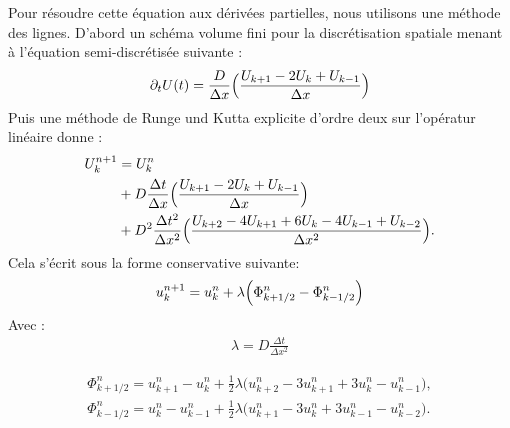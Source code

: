 Pour résoudre cette équation aux dérivées partielles, nous utilisons une méthode des lignes. 
D'abord un schéma volume fini pour la discrétisation spatiale menant à l'équation semi-discrétisée suivante : 
\begin{align}
    \partial_t U(t) = \frac{D}{\Delta x} \Bigl(\frac{U_{k+1} - 2 U_{k} + U_{k-1}}{\Delta x}\Bigr)
\end{align}
Puis une méthode de Runge und Kutta explicite d'ordre deux sur l'opératur linéaire donne :
\begin{align}
    U_k^{n+1} &= U_k^n\\ \notag
    &+ D \frac{\Delta t}{\Delta x} \Bigl(\frac{U_{k+1} - 2 U_{k} + U_{k-1}}{\Delta x}\Bigr)\\ \notag
    &+ D^2 \frac{\Delta t^2}{\Delta x^2} \Bigl(\frac{U_{k+2} -4 U_{k+1}  +6 U_{k} -4 U_{k-1} + U_{k-2}}{\Delta x^2}\Bigr).
\end{align}
Cela s'écrit sous la forme conservative suivante:
\begin{align}
    u^{n+1}_k = u^n_k + \lambda \Bigl( \Phi^n_{k+1/2} - \Phi^n_{k-1/2} \Bigr)
\end{align}
Avec : 
\begin{align}
    \lambda = D \frac{\Delta t}{\Delta x^2}
\end{align}

\begin{align}
    \Phi^n_{k+1/2} = u^n_{k+1} - u^n_{k} + \frac{1}{2} \lambda \bigr( u^n_{k+2} - 3  u^n_{k+1} + 3 u^n_{k} - u^n_{k-1} \bigl),\\
    \Phi^n_{k-1/2} = u^n_{k} - u^n_{k-1} + \frac{1}{2} \lambda \bigr( u^n_{k+1} - 3  u^n_{k} + 3 u^n_{k-1} - u^n_{k-2} \bigl).  
\end{align}

